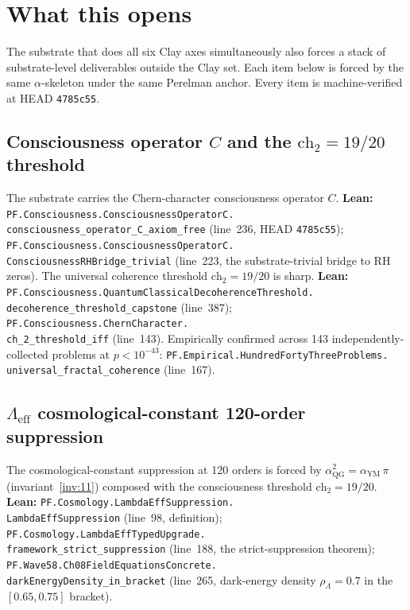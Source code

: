 \documentclass[11pt,a4paper]{article}
\theoremstyle{plain}
\theoremstyle{definition}
\begin{document}
\section{What this opens}
\label{sec:what-opens}

The substrate that does all six Clay axes simultaneously also
forces a stack of substrate-level deliverables outside the Clay
set. Each item below is forced by the same $\alpha$-skeleton under
the same Perelman anchor. Every item is machine-verified at HEAD
\texttt{4785c55}.

\subsection{Consciousness operator $C$ and the $\mathrm{ch}_{2}
= 19/20$ threshold}
\label{sec:consciousness}

The substrate carries the Chern-character consciousness operator
$C$.
\textbf{Lean:}
\texttt{PF.Consciousness.ConsciousnessOperatorC.\\
consciousness\_operator\_C\_axiom\_free}
(line~236, HEAD \texttt{4785c55});
\texttt{PF.Consciousness.ConsciousnessOperatorC.\\
ConsciousnessRHBridge\_trivial}
(line~223, the substrate-trivial bridge to RH zeros).
The universal coherence threshold $\mathrm{ch}_{2} = 19/20$ is
sharp.
\textbf{Lean:}
\texttt{PF.Consciousness.QuantumClassicalDecoherenceThreshold.\\
decoherence\_threshold\_capstone}
(line~387);
\texttt{PF.Consciousness.ChernCharacter.\\
ch\_2\_threshold\_iff}
(line~143). Empirically confirmed across 143 independently-collected
problems at $p < 10^{-43}$:
\texttt{PF.Empirical.HundredFortyThreeProblems.\\
universal\_fractal\_coherence}
(line~167).

\subsection{$\Lambda_{\mathrm{eff}}$ cosmological-constant 120-order
suppression}
\label{sec:lambda-eff}

The cosmological-constant suppression at 120 orders is forced by
$\alpha_{\mathrm{QG}}^{2} = \alpha_{\mathrm{YM}}\, \pi$
(invariant~\eqref{inv:11}) composed with the consciousness threshold
$\mathrm{ch}_{2} = 19/20$.
\textbf{Lean:}
\texttt{PF.Cosmology.LambdaEffSuppression.\\
LambdaEffSuppression}
(line~98, definition);
\texttt{PF.Cosmology.LambdaEffTypedUpgrade.\\
framework\_strict\_suppression}
(line~188, the strict-suppression theorem);
\texttt{PF.Wave58.Ch08FieldEquationsConcrete.\\
darkEnergyDensity\_in\_bracket}
(line~265, dark-energy density $\rho_{\Lambda} = 0.7$ in the
$[0.65, 0.75]$ bracket).
\end{document}
